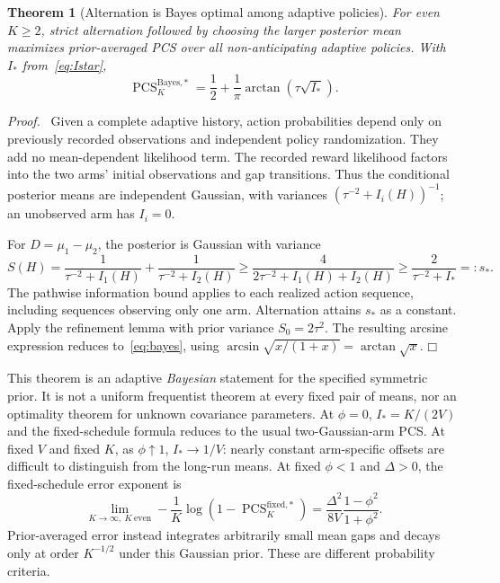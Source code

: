 \documentclass[11pt]{article}
\newtheorem{theorem}{Theorem}
\newenvironment{proof}{\par\noindent\textit{Proof.}\ }{\hfill$\mdlgwhtsquare$\par\medskip}
\newcommand{\PCS}{\operatorname{PCS}}
\begin{document}
\begin{theorem}[Alternation is Bayes optimal among adaptive policies]
For even $K\geq2$, strict alternation followed by choosing the larger posterior mean maximizes prior-averaged PCS over all non-anticipating adaptive policies. With $I_*$ from~\eqref{eq:Istar},
\begin{equation}
\boxed{\PCS_K^{\mathrm{Bayes},*}
=\frac12+\frac1\pi\arctan(\tau\sqrt{I_*}).}
\label{eq:bayes}
\end{equation}
\end{theorem}
\begin{proof}
Given a complete adaptive history, action probabilities depend only on previously recorded observations and independent policy randomization. They add no mean-dependent likelihood term. The recorded reward likelihood factors into the two arms' initial observations and gap transitions. Thus the conditional posterior means are independent Gaussian, with variances $(\tau^{-2}+I_i(H))^{-1}$; an unobserved arm has $I_i=0$.

For $D=\mu_1-\mu_2$, the posterior is Gaussian with variance
\[
S(H)=\frac1{\tau^{-2}+I_1(H)}+
\frac1{\tau^{-2}+I_2(H)}
\geq\frac4{2\tau^{-2}+I_1(H)+I_2(H)}
\geq\frac2{\tau^{-2}+I_*}=:s_*.
\]
The pathwise information bound applies to each realized action sequence, including sequences observing only one arm. Alternation attains $s_*$ as a constant. Apply the refinement lemma with prior variance $S_0=2\tau^2$. The resulting arcsine expression reduces to~\eqref{eq:bayes}, using
$\arcsin\sqrt{x/(1+x)}=\arctan\sqrt x$.
\end{proof}

This theorem is an adaptive \emph{Bayesian} statement for the specified symmetric prior. It is not a uniform frequentist theorem at every fixed pair of means, nor an optimality theorem for unknown covariance parameters. At $\phi=0$, $I_*=K/(2V)$ and the fixed-schedule formula reduces to the usual two-Gaussian-arm PCS. At fixed $V$ and fixed $K$, as $\phi\uparrow1$, $I_*\to1/V$: nearly constant arm-specific offsets are difficult to distinguish from the long-run means. At fixed $\phi<1$ and $\Delta>0$, the fixed-schedule error exponent is
\begin{equation}
\lim_{K\to\infty,\ K\ \mathrm{even}}-
\frac1K\log(1-\PCS_K^{\mathrm{fixed},*})
=\frac{\Delta^2}{8V}\frac{1-\phi^2}{1+\phi^2}.
\end{equation}
Prior-averaged error instead integrates arbitrarily small mean gaps and decays only at order $K^{-1/2}$ under this Gaussian prior. These are different probability criteria.
\end{document}
